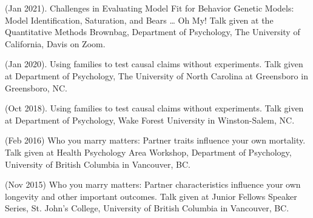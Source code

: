 
\item\meb (Jan 2021). Challenges in Evaluating Model Fit for Behavior Genetic Models: Model Identification, Saturation, and Bears … Oh My! Talk given at the Quantitative Methods Brownbag, Department of Psychology, The University of California, Davis on Zoom.

\item\meb (Jan 2020). Using families to test causal claims without experiments. Talk given at Department of Psychology, The University of North Carolina at Greensboro in Greensboro, NC.
%
%
%
\item\meb (Oct 2018). Using families to test causal claims without experiments. Talk given at Department of Psychology, Wake Forest University in Winston-Salem, NC.
%
\item \meb (Feb 2016) Who you marry matters: Partner traits influence your own mortality. Talk given at Health Psychology Area Workshop, Department of Psychology, University of British Columbia in Vancouver, BC. 
%
\item \meb (Nov 2015) Who you marry matters: Partner characteristics influence your own longevity and other important outcomes. Talk given at Junior Fellows Speaker Series, St. John's College, University of British Columbia in Vancouver, BC. \smallskip

